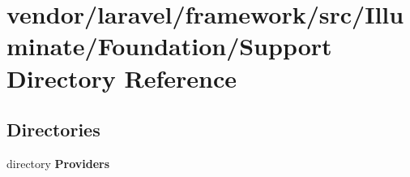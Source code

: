 \section{vendor/laravel/framework/src/\+Illuminate/\+Foundation/\+Support Directory Reference}
\label{dir_1e10f88689856cfbd87a0f28613c9400}
\subsection*{Directories}
\begin{DoxyCompactItemize}
\item 
directory {\bf Providers}
\end{DoxyCompactItemize}
